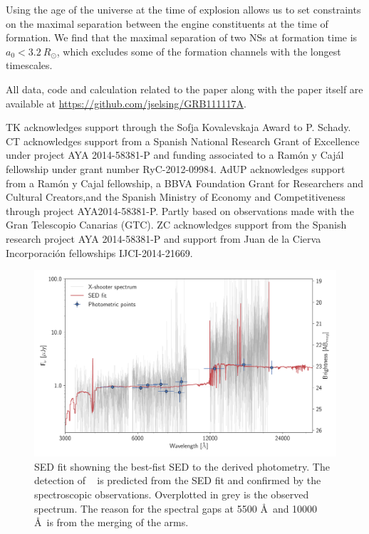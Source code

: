 \documentclass{aa}    %
\begin{document}
Using the age of the universe at the time of explosion allows us to set
constraints on the maximal separation between the engine constituents at the
time of formation. We find that the maximal separation of two NSs at
formation time is $a_0 < 3.2~R_\odot$, which excludes some of the formation
channels with the longest timescales.

All data, code and calculation related to the paper along with the
paper itself are available at \url{https://github.com/jselsing/GRB111117A}.

\begin{acknowledgements}
TK acknowledges support through the Sofja Kovalevskaja Award to P. Schady. 
CT acknowledges support from a Spanish National Research Grant of Excellence under project AYA 2014-58381-P and funding associated to a Ramón y Cajál fellowship under grant number RyC-2012-09984.
AdUP acknowledges support from a Ramón y Cajal fellowship, a BBVA Foundation Grant for Researchers and Cultural Creators,and the Spanish Ministry of Economy and Competitiveness through project AYA2014-58381-P.
Partly based on observations made with the Gran Telescopio Canarias (GTC).
ZC acknowledges support from the Spanish research project AYA 2014-58381-P and support from Juan de la Cierva Incorporaci\'on fellowships IJCI-2014-21669. 

\end{acknowledgements}




\newpage





 \begin{figure}
 	\centering
 	\includegraphics[width=16cm]{figures/SEDspecphot.pdf}
 	\caption{SED fit showning the best-fist SED to the derived photometry. The detection of \lya~ is predicted from the SED fit and confirmed by the spectroscopic observations. Overplotted in grey is the observed spectrum. The reason for the spectral gaps at 5500 \AA~and 10000 \AA~is from the merging of the arms.}
 	\label{fig:SED}
 \end{figure}
\end{document}
